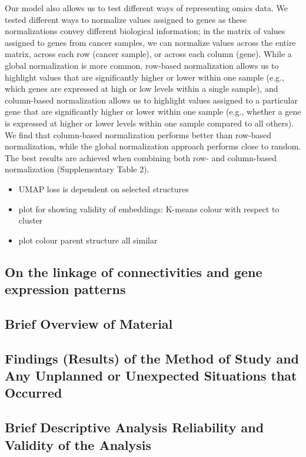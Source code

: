 \documentclass[]{article}
\begin{document}
Our model also allows us to test different ways of representing omics data. We
tested different ways to normalize values assigned to genes as these normalizations
convey different biological information; in the matrix of values assigned to genes from
cancer samples, we can normalize values across the entire matrix, across each row
(cancer sample), or across each column (gene). While a global normalization is more
common, row-based normalization allows us to highlight values that are significantly
higher or lower within one sample (e.g., which genes are expressed at high or low levels within a single sample), and column-based normalization allows us to highlight values
assigned to a particular gene that are significantly higher or lower within one sample
(e.g., whether a gene is expressed at higher or lower levels within one sample compared
to all others). We find that column-based normalization performs better than row-based
normalization, while the global normalization approach performs close to random. The
best results are achieved when combining both row- and column-based normalization
(Supplementary Table 2).	


\begin{itemize}
	\item UMAP loss is dependent on selected structures

	\item plot for showing validity of embeddings: K-means colour with respect to cluster 
	\item plot colour parent structure all similar
\end{itemize}

\subsection{On the linkage of connectivities and gene expression patterns}

\subsection*{Brief Overview of Material}
\subsection*{Findings (Results) of the Method of Study and Any Unplanned or Unexpected Situations that Occurred}
\subsection*{Brief Descriptive Analysis
Reliability and Validity of the Analysis}
\end{document}
